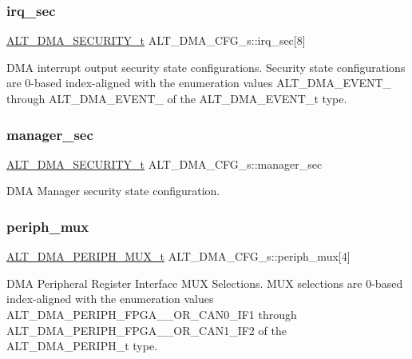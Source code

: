 \subsubsection{\texorpdfstring{irq\_sec}{irq\_sec}}
{\footnotesize\ttfamily \mbox{\hyperlink{group__ALT__DMA__COMMON_ga59d720d9a72123eca037cc48a734fd7c}{A\+L\+T\+\_\+\+D\+M\+A\+\_\+\+S\+E\+C\+U\+R\+I\+T\+Y\+\_\+t}} A\+L\+T\+\_\+\+D\+M\+A\+\_\+\+C\+F\+G\+\_\+s\+::irq\+\_\+sec\mbox{[}8\mbox{]}}

D\+MA interrupt output security state configurations. Security state configurations are 0-\/based index-\/aligned with the enumeration values A\+L\+T\+\_\+\+D\+M\+A\+\_\+\+E\+V\+E\+N\+T\+\_ through A\+L\+T\+\_\+\+D\+M\+A\+\_\+\+E\+V\+E\+N\+T\+\_ of the A\+L\+T\+\_\+\+D\+M\+A\+\_\+\+E\+V\+E\+N\+T\+\_\+t type. \mbox{\label{structALT__DMA__CFG__s_a8beb2d261a68ceb5c40d7f625245d413}} 
\subsubsection{\texorpdfstring{manager\_sec}{manager\_sec}}
{\footnotesize\ttfamily \mbox{\hyperlink{group__ALT__DMA__COMMON_ga59d720d9a72123eca037cc48a734fd7c}{A\+L\+T\+\_\+\+D\+M\+A\+\_\+\+S\+E\+C\+U\+R\+I\+T\+Y\+\_\+t}} A\+L\+T\+\_\+\+D\+M\+A\+\_\+\+C\+F\+G\+\_\+s\+::manager\+\_\+sec}

D\+MA Manager security state configuration. \mbox{\label{structALT__DMA__CFG__s_a505d1d038be5147bbca6542e68e64d29}} 
\subsubsection{\texorpdfstring{periph\_mux}{periph\_mux}}
{\footnotesize\ttfamily \mbox{\hyperlink{group__ALT__DMA__CSR_ga58c7617e50eb450a5435798a109a266d}{A\+L\+T\+\_\+\+D\+M\+A\+\_\+\+P\+E\+R\+I\+P\+H\+\_\+\+M\+U\+X\+\_\+t}} A\+L\+T\+\_\+\+D\+M\+A\+\_\+\+C\+F\+G\+\_\+s\+::periph\+\_\+mux\mbox{[}4\mbox{]}}

D\+MA Peripheral Register Interface M\+UX Selections. M\+UX selections are 0-\/based index-\/aligned with the enumeration values A\+L\+T\+\_\+\+D\+M\+A\+\_\+\+P\+E\+R\+I\+P\+H\+\_\+\+F\+P\+G\+A\+\_\+\_\+\+O\+R\+\_\+\+C\+A\+N0\+\_\+\+I\+F1 through A\+L\+T\+\_\+\+D\+M\+A\+\_\+\+P\+E\+R\+I\+P\+H\+\_\+\+F\+P\+G\+A\+\_\+\_\+\+O\+R\+\_\+\+C\+A\+N1\+\_\+\+I\+F2 of the A\+L\+T\+\_\+\+D\+M\+A\+\_\+\+P\+E\+R\+I\+P\+H\+\_\+t type. \mbox{\label{structALT__DMA__CFG__s_a1968f1fbbf77ba088dc4ef9655878df4}} 

